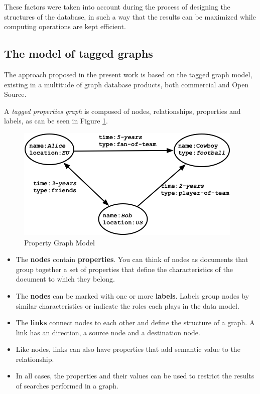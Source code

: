 	These factors were taken into account during the process of designing the structures of the database, in such a way that the results can be maximized while computing operations are kept efficient.
	
	\subsection{The model of tagged graphs}
	
	The approach proposed in the present work is based on the tagged graph model, existing in a multitude of graph database products, both commercial and Open Source.
	
	A \emph{tagged properties graph} is composed of nodes, relationships, properties and labels, as can be seen in Figure \ref{fig:property-graph-model-eng}.
	
	\begin{figure}[h]
		\centering
		\includegraphics[scale=0.5]{./images/property-graph-model}
		\caption{Property Graph Model}
		\label{fig:property-graph-model-eng}
	\end{figure}

	\begin{itemize}
		\item The \textbf{nodes} contain \textbf{properties}. You can think of nodes as documents that group together a set of properties that define the characteristics of the document to which they belong.
		\item The \textbf{nodes} can be marked with one or more \textbf {labels}. Labels group nodes by similar characteristics or indicate the roles each plays in the data model.
		\item The \textbf{links} connect nodes to each other and define the structure of a graph. A link has an direction, a source node and a destination node.
		\item Like nodes, links can also have properties that add semantic value to the relationship.
		\item In all cases, the properties and their values can be used to restrict the results of searches performed in a graph.
	\end{itemize}

